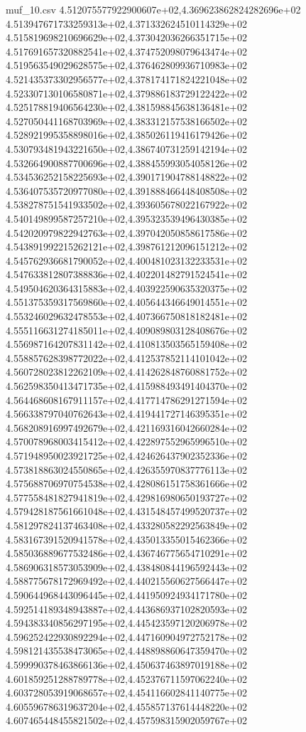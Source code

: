 \begin{filecontents*}{muf_10.csv}
4.512075577922900607e+02,4.369623862824282696e+02
4.513947671733259313e+02,4.371332624510114329e+02
4.515819698210696629e+02,4.373042036266351715e+02
4.517691657320882541e+02,4.374752098079643474e+02
4.519563549029628575e+02,4.376462809936710983e+02
4.521435373302956577e+02,4.378174171824221048e+02
4.523307130106580871e+02,4.379886183729122422e+02
4.525178819406564230e+02,4.381598845638136481e+02
4.527050441168703969e+02,4.383312157538166502e+02
4.528921995358898016e+02,4.385026119416179426e+02
4.530793481943221650e+02,4.386740731259142194e+02
4.532664900887700696e+02,4.388455993054058126e+02
4.534536252158225693e+02,4.390171904788148822e+02
4.536407535720977080e+02,4.391888466448408508e+02
4.538278751541933502e+02,4.393605678022167922e+02
4.540149899587257210e+02,4.395323539496430385e+02
4.542020979822942763e+02,4.397042050858617586e+02
4.543891992215262121e+02,4.398761212096151212e+02
4.545762936681790052e+02,4.400481023132233531e+02
4.547633812807388836e+02,4.402201482791524541e+02
4.549504620364315883e+02,4.403922590635320375e+02
4.551375359317569860e+02,4.405644346649014551e+02
4.553246029632478553e+02,4.407366750818182481e+02
4.555116631274185011e+02,4.409089803128408676e+02
4.556987164207831142e+02,4.410813503565159408e+02
4.558857628398772022e+02,4.412537852114101042e+02
4.560728023812262109e+02,4.414262848760881752e+02
4.562598350413471735e+02,4.415988493491404370e+02
4.564468608167911157e+02,4.417714786291271594e+02
4.566338797040762643e+02,4.419441727146395351e+02
4.568208916997492679e+02,4.421169316042660284e+02
4.570078968003415412e+02,4.422897552965996510e+02
4.571948950023921725e+02,4.424626437902352336e+02
4.573818863024550865e+02,4.426355970837776113e+02
4.575688706970754538e+02,4.428086151758361666e+02
4.577558481827941819e+02,4.429816980650193727e+02
4.579428187561661048e+02,4.431548457499520737e+02
4.581297824137463408e+02,4.433280582292563849e+02
4.583167391520941578e+02,4.435013355015462366e+02
4.585036889677532486e+02,4.436746775654710291e+02
4.586906318573053909e+02,4.438480844196592443e+02
4.588775678172969492e+02,4.440215560627566447e+02
4.590644968443096445e+02,4.441950924934171780e+02
4.592514189348943887e+02,4.443686937102820593e+02
4.594383340856297195e+02,4.445423597120206978e+02
4.596252422930892294e+02,4.447160904972752178e+02
4.598121435538473065e+02,4.448898860647359470e+02
4.599990378463866136e+02,4.450637463897019188e+02
4.601859251288789778e+02,4.452376711597062240e+02
4.603728053919068657e+02,4.454116602841140775e+02
4.605596786319637204e+02,4.455857137614448220e+02
4.607465448455821502e+02,4.457598315902059767e+02

\end{filecontents*}
